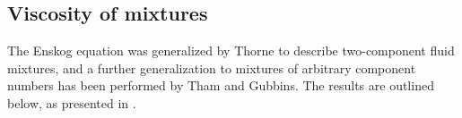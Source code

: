 
\subsection{Viscosity of mixtures}

The Enskog equation was generalized by Thorne to describe two-component 
fluid mixtures\cite{ref:chapman:non_uniform_gases}, and a further 
generalization to mixtures of arbitrary component numbers has been 
performed by Tham and Gubbins\cite{ref:tham:fluid_mixtures}.
The results are outlined below, as presented in \cite{ref:pippo:composition_dependence}.


